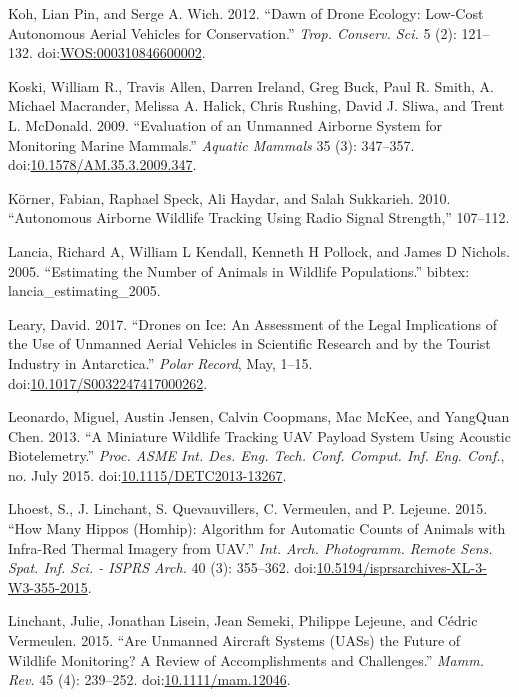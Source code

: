 \documentclass[]{interact}
\theoremstyle{plain}%
\theoremstyle{definition}
\theoremstyle{remark}
\begin{document}
\hypertarget{ref-koh_dawn_2012}{}
Koh, Lian Pin, and Serge A. Wich. 2012. ``Dawn of Drone Ecology:
Low-Cost Autonomous Aerial Vehicles for Conservation.'' \emph{Trop.
Conserv. Sci.} 5 (2): 121--132.
doi:\href{https://doi.org/WOS:000310846600002}{WOS:000310846600002}.

\hypertarget{ref-koski_evaluation_2009}{}
Koski, William R., Travis Allen, Darren Ireland, Greg Buck, Paul R.
Smith, A. Michael Macrander, Melissa A. Halick, Chris Rushing, David J.
Sliwa, and Trent L. McDonald. 2009. ``Evaluation of an Unmanned Airborne
System for Monitoring Marine Mammals.'' \emph{Aquatic Mammals} 35 (3):
347--357.
doi:\href{https://doi.org/10.1578/AM.35.3.2009.347}{10.1578/AM.35.3.2009.347}.

\hypertarget{ref-korner_autonomous_2010}{}
Körner, Fabian, Raphael Speck, Ali Haydar, and Salah Sukkarieh. 2010.
``Autonomous Airborne Wildlife Tracking Using Radio Signal Strength,''
107--112.

\hypertarget{ref-lancia_estimating_2005}{}
Lancia, Richard A, William L Kendall, Kenneth H Pollock, and James D
Nichols. 2005. ``Estimating the Number of Animals in Wildlife
Populations.'' bibtex: lancia\_estimating\_2005.

\hypertarget{ref-leary_drones_2017}{}
Leary, David. 2017. ``Drones on Ice: An Assessment of the Legal
Implications of the Use of Unmanned Aerial Vehicles in Scientific
Research and by the Tourist Industry in Antarctica.'' \emph{Polar
Record}, May, 1--15.
doi:\href{https://doi.org/10.1017/S0032247417000262}{10.1017/S0032247417000262}.

\hypertarget{ref-leonardo_miniature_2013}{}
Leonardo, Miguel, Austin Jensen, Calvin Coopmans, Mac McKee, and
YangQuan Chen. 2013. ``A Miniature Wildlife Tracking UAV Payload System
Using Acoustic Biotelemetry.'' \emph{Proc. ASME Int. Des. Eng. Tech.
Conf. Comput. Inf. Eng. Conf.}, no. July 2015.
doi:\href{https://doi.org/10.1115/DETC2013-13267}{10.1115/DETC2013-13267}.

\hypertarget{ref-lhoest_how_2015}{}
Lhoest, S., J. Linchant, S. Quevauvillers, C. Vermeulen, and P. Lejeune.
2015. ``How Many Hippos (Homhip): Algorithm for Automatic Counts of
Animals with Infra-Red Thermal Imagery from UAV.'' \emph{Int. Arch.
Photogramm. Remote Sens. Spat. Inf. Sci. - ISPRS Arch.} 40 (3):
355--362.
doi:\href{https://doi.org/10.5194/isprsarchives-XL-3-W3-355-2015}{10.5194/isprsarchives-XL-3-W3-355-2015}.

\hypertarget{ref-linchant_are_2015}{}
Linchant, Julie, Jonathan Lisein, Jean Semeki, Philippe Lejeune, and
Cédric Vermeulen. 2015. ``Are Unmanned Aircraft Systems (UASs) the
Future of Wildlife Monitoring? A Review of Accomplishments and
Challenges.'' \emph{Mamm. Rev.} 45 (4): 239--252.
doi:\href{https://doi.org/10.1111/mam.12046}{10.1111/mam.12046}.
\end{document}
